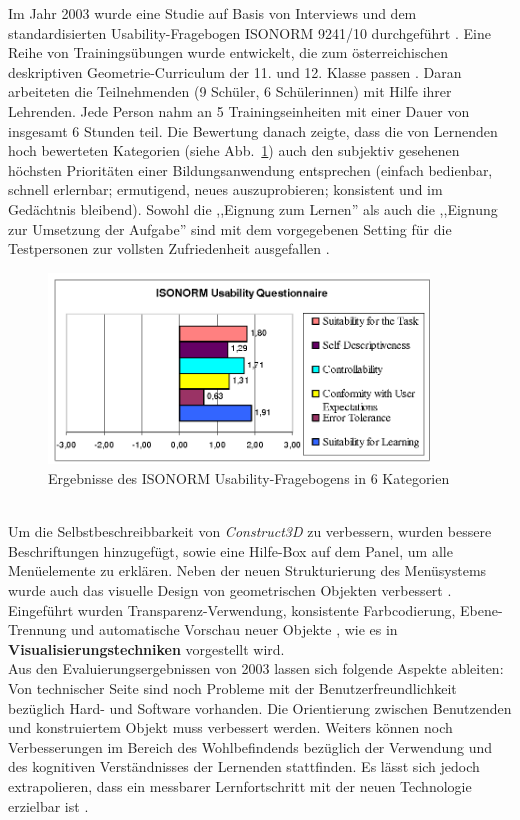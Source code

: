 \documentclass[deutsch]{llncs}
\begin{document}
 Im Jahr 2003 wurde eine Studie auf Basis von Interviews und dem standardisierten Usability-Fragebogen ISONORM 9241/10 durchgeführt \cite{Kaufmann_summaryof}. Eine Reihe von Trainingsübungen wurde entwickelt, die zum österreichischen deskriptiven Geometrie-Curriculum der 11. und 12. Klasse passen \cite{Kaufmann_summaryof}.  Daran arbeiteten die Teilnehmenden (9 Schüler, 6 Schülerinnen) mit Hilfe ihrer Lehrenden. Jede Person nahm an 5 Trainingseinheiten mit einer Dauer von insgesamt 6 Stunden teil. Die Bewertung danach zeigte, dass die von Lernenden hoch bewerteten Kategorien (siehe Abb.~\ref{fig:isonorm}) auch den subjektiv gesehenen höchsten Prioritäten einer Bildungsanwendung entsprechen (einfach bedienbar, schnell erlernbar; ermutigend, neues auszuprobieren; konsistent und im Gedächtnis bleibend)\cite{Kaufmann_summaryof}. Sowohl die ,,Eignung zum Lernen'' als auch die ,,Eignung zur Umsetzung der Aufgabe'' sind mit dem vorgegebenen Setting für die Testpersonen zur vollsten Zufriedenheit ausgefallen \cite{1667626}.
\begin{figure}[t]
	\centering
	\includegraphics[width=0.9\textwidth]{figures/isonorm}
	\caption{Ergebnisse des ISONORM Usability-Fragebogens in 6 Kategorien \cite{Kaufmann_summaryof}}
	\label{fig:isonorm}
\end{figure}
\\Um die Selbstbeschreibbarkeit von \emph{Construct3D} zu verbessern, wurden bessere Beschriftungen hinzugefügt, sowie eine Hilfe-Box auf dem Panel, um alle Menüelemente zu erklären. Neben der neuen Strukturierung des Menüsystems wurde auch das visuelle Design von geometrischen Objekten verbessert  \cite{Kaufmann_summaryof}.  Eingeführt wurden Transparenz-Verwendung, konsistente Farbcodierung, Ebene-Trennung und automatische Vorschau neuer Objekte \cite{Kaufmann_summaryof}, wie es in \textbf{Visualisierungstechniken} vorgestellt wird.\\
Aus den Evaluierungsergebnissen von 2003 lassen sich folgende Aspekte ableiten: Von technischer Seite sind noch Probleme mit der Benutzerfreundlichkeit bezüglich Hard- und Software vorhanden. Die Orientierung zwischen Benutzenden und konstruiertem Objekt muss verbessert werden. Weiters können noch Verbesserungen im Bereich des Wohlbefindends bezüglich der Verwendung und des kognitiven Verständnisses der Lernenden stattfinden. Es lässt sich jedoch extrapolieren, dass ein messbarer Lernfortschritt mit der neuen Technologie erzielbar ist \cite{article}. \\
\end{document}
